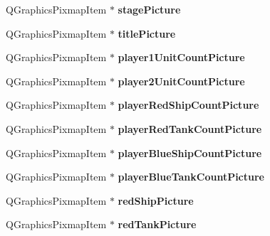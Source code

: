 \begin{DoxyCompactItemize}
\item 
Q\+Graphics\+Pixmap\+Item $\ast$ {\bfseries stage\+Picture}\hypertarget{class_game_menu_ac9149690e856b17578f3f7fdb932f7a1}{}\label{class_game_menu_ac9149690e856b17578f3f7fdb932f7a1}

\item 
Q\+Graphics\+Pixmap\+Item $\ast$ {\bfseries title\+Picture}\hypertarget{class_game_menu_ad6a103544d02d3cb04f33dfe35676c00}{}\label{class_game_menu_ad6a103544d02d3cb04f33dfe35676c00}

\item 
Q\+Graphics\+Pixmap\+Item $\ast$ {\bfseries player1\+Unit\+Count\+Picture}\hypertarget{class_game_menu_a1fb70748425976821089be584d3f3840}{}\label{class_game_menu_a1fb70748425976821089be584d3f3840}

\item 
Q\+Graphics\+Pixmap\+Item $\ast$ {\bfseries player2\+Unit\+Count\+Picture}\hypertarget{class_game_menu_aa68b9697560092eb9c78d10945df0b1f}{}\label{class_game_menu_aa68b9697560092eb9c78d10945df0b1f}

\item 
Q\+Graphics\+Pixmap\+Item $\ast$ {\bfseries player\+Red\+Ship\+Count\+Picture}\hypertarget{class_game_menu_a930dfe40b7944b923cba0573a1ac2e55}{}\label{class_game_menu_a930dfe40b7944b923cba0573a1ac2e55}

\item 
Q\+Graphics\+Pixmap\+Item $\ast$ {\bfseries player\+Red\+Tank\+Count\+Picture}\hypertarget{class_game_menu_a5e1eaab4a213cf591a8f795170385cec}{}\label{class_game_menu_a5e1eaab4a213cf591a8f795170385cec}

\item 
Q\+Graphics\+Pixmap\+Item $\ast$ {\bfseries player\+Blue\+Ship\+Count\+Picture}\hypertarget{class_game_menu_a7ed3930e5a8f355cd35a71324b83623f}{}\label{class_game_menu_a7ed3930e5a8f355cd35a71324b83623f}

\item 
Q\+Graphics\+Pixmap\+Item $\ast$ {\bfseries player\+Blue\+Tank\+Count\+Picture}\hypertarget{class_game_menu_a29de28479797b06dfe7dd9b45d5f028d}{}\label{class_game_menu_a29de28479797b06dfe7dd9b45d5f028d}

\item 
Q\+Graphics\+Pixmap\+Item $\ast$ {\bfseries red\+Ship\+Picture}\hypertarget{class_game_menu_ae84c38f6ebfb2e3ff1706cbc68486664}{}\label{class_game_menu_ae84c38f6ebfb2e3ff1706cbc68486664}

\item 
Q\+Graphics\+Pixmap\+Item $\ast$ {\bfseries red\+Tank\+Picture}\hypertarget{class_game_menu_a45bc69ba75f458e21d7f3a1ea63dd666}{}\label{class_game_menu_a45bc69ba75f458e21d7f3a1ea63dd666}


\end{DoxyCompactItemize}
